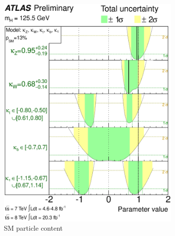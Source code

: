 \begin{figure}[t]
	\begin{subfigure}[b]{0.495\textwidth}
		\centering
		\includegraphics[width=\textwidth]{tex/conclusions/atlas_couplings_SM}
		\caption{SM particle content}
		\label{fig:concl:couplings:SM}
	\end{subfigure}
	\hfill
	\begin{subfigure}[b]{0.495\textwidth}
		\centering

\end{subfigure}
\end{figure}
